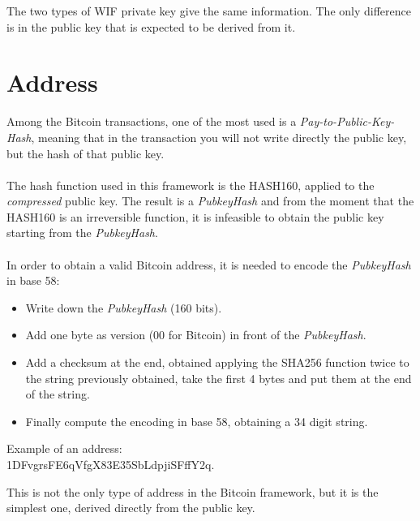 \begin{remark}
	The two types of WIF private key give the same information. The only difference is in the public key that is expected to be derived from it. 
\end{remark}

\section{Address}
Among the Bitcoin transactions, one of the most used is a \textit{Pay-to-Public-Key-Hash}, meaning that in the transaction you will not write directly the public key, but the hash of that public key.
\\ \\
The hash function used in this framework is the HASH160, applied to the \textit{compressed} public key. The result is a \textit{PubkeyHash} and from the moment that the HASH160 is an irreversible function, it is infeasible to obtain the public key starting from the \textit{PubkeyHash}. 
\\ \\
In order to obtain a valid Bitcoin address, it is needed to encode the \textit{PubkeyHash} in base 58:

\begin{itemize}
	\item Write down the \textit{PubkeyHash} (160 bits).
	\item Add one byte as version ($00$ for Bitcoin) in front of the \textit{PubkeyHash}.
	\item Add a checksum at the end, obtained applying the SHA256 function twice to the string previously obtained, take the first 4 bytes and put them at the end of the string.
	\item Finally compute the encoding in base 58, obtaining a 34 digit string.
\end{itemize}
Example of an address: \\
1DFvgrsFE6qVfgX83E35SbLdpjiSFffY2q.

\begin{remark}
	This is not the only type of address in the Bitcoin framework, but it is the simplest one, derived directly from the public key. 
\end{remark}

